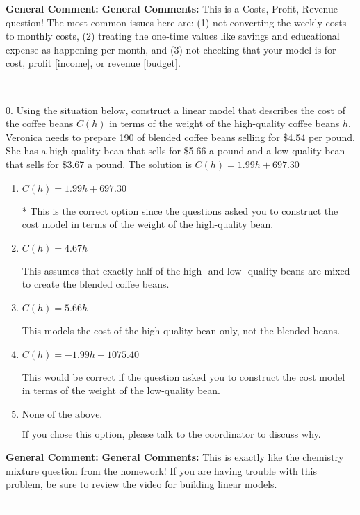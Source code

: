 \documentclass{extbook}[14pt]
\begin{document}
\textbf{General Comment:} \textbf{General Comments:} This is a Costs, Profit, Revenue question! The most common issues here are: (1) not converting the weekly costs to monthly costs, (2) treating the one-time values like savings and educational expense as happening per month, and (3) not checking that your model is for cost, profit [income], or revenue [budget]. 

-----------------------------------------------

0. Using the situation below, construct a linear model that describes the cost of the coffee beans $C(h)$ in terms of the weight of the high-quality coffee beans $h$.
Veronica needs to prepare 190 of blended coffee beans selling for \$4.54 per pound. She has a high-quality bean that sells for \$5.66 a pound and a low-quality bean that sells for \$3.67 a pound. 
The solution is $ C(h) = 1.99 h + 697.30 $ 

\begin{enumerate}[label=\Alph*.] 
\item $ C(h) = 1.99 h + 697.30 $ 

 * This is the correct option since the questions asked you to construct the cost model in terms of the weight of the high-quality bean. 
\item $ C(h) = 4.67 h $ 

 This assumes that exactly half of the high- and low- quality beans are mixed to create the blended coffee beans. 
\item $ C(h) = 5.66 h $ 

 This models the cost of the high-quality bean only, not the blended beans. 
\item $ C(h) = -1.99 h + 1075.40 $ 

 This would be correct if the question asked you to construct the cost model in terms of the weight of the low-quality bean. 
\item $ \text{None of the above.} $ 

 If you chose this option, please talk to the coordinator to discuss why. 
\end{enumerate} 
 
\textbf{General Comment:} \textbf{General Comments:} This is exactly like the chemistry mixture question from the homework! If you are having trouble with this problem, be sure to review the video for building linear models. 

-----------------------------------------------
\end{document}

